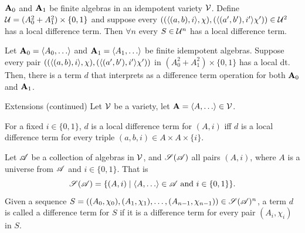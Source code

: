 \documentclass[notes=hide,12pt,xcolor=dvipsnames%
   ]{beamer}
\renewcommand{\cite}[1]{\relax}
\newcommand{\defin}[1]{\alert{#1}}
\theoremstyle{definition}
\begin{document}
\begin{frame}[label=extensions]{~}


  \begin{theorem} %
  \label{thm:mixed-local-diff-terms}
  $\mathbf{A}_0$ and   $\mathbf{A}_1$ be finite algebras in an idempotent variety $\mathcal{V}$.
  Define $\mathcal{U}  = (A_0^2 + A_1^2)\times \{0,1\}$
  and suppose every 
  $((\langle(a, b), i\rangle, \chi), (\langle(a', b'), i'\rangle\chi')) \in \mathcal{U}^2$
  has a local difference term.
  Then $\forall n$ every $S \in \mathcal{U}^n$
  has a local difference term.
  \end{theorem}

  \pause

  \begin{corollary}
  \label{cor:mix-loc-diff-term}
  Let $\bA_0 = \<A_0, \dots\>$ and   $\bA_1 = \<A_1, \dots\>$ be 
  finite idempotent algebras.
  Suppose every pair
  $((\langle(a, b), i\rangle, \chi), (\langle(a', b'), i'\rangle\chi'))$
  in $(A_0^2 + A_1^2)\times \{0,1\}$
  has a local dt. Then, there is a term $d$ that interprets as a
  difference term operation for both $\mathbf{A}_0$ and $\mathbf{A}_1$.
  \end{corollary}
\end{frame}

\begin{frame}[label=extensions]{Extensions (continued)}
  Let $\mathcal{V}$ be a variety, let $\bA = \<A, \dots\> \in \sV$. 

  For a fixed $i\in \{0,1\}$, $d$ is a \defin{local difference term for $(A, i)$} iff
  $d$ is a local difference term for every triple
  $(a,b,i) \in A \times A \times \{i\}$.

  \pause
  Let $\mathscr{A}$ be a collection of algebras in $\mathcal{V}$, and
  $\mathscr{S}(\mathscr{A})$ all pairs $(A, i)$,
  where $A$ is a universe from $\mathscr{A}$ and $i\in \{0,1\}$. That is
  \[
  \scS(\scA) = \{(A, i) \mid \<A, \dots\> \in \scA \text{ and } i \in \{0,1\}\}.
  \]
  \pause
  Given a sequence
  $S = ((A_0, \chi_0), (A_1, \chi_1), \dots,
  (A_{n-1},\chi_{n-1})) \in \mathscr{S}(\mathscr{A})^n$,
  a term $d$ is called a \defin{\glocal difference term for $S$}
  if it is a \glocal difference term for every pair $(A_i, \chi_i)$ in $S$.
  
\end{frame}
\end{document}
